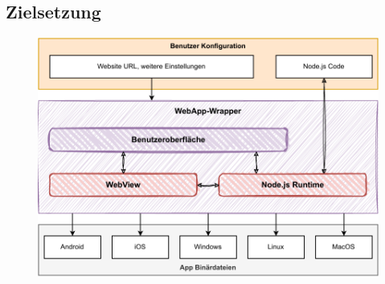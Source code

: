 \subsection{Zielsetzung}

\begin{figure}[H]
    \centering
    \includegraphics[width=\textwidth]{assets/04_WebApp-Wrapper/01_Zielsetzung.drawio.pdf}
\end{figure}


\clearpage
